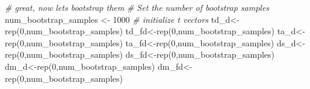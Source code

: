 \documentclass[
]{article}
\newenvironment{Shaded}{\begin{snugshade}}{\end{snugshade}}
\newcommand{\CommentTok}[1]{\textcolor[rgb]{0.56,0.35,0.01}{\textit{#1}}}
\newcommand{\DecValTok}[1]{\textcolor[rgb]{0.00,0.00,0.81}{#1}}
\newcommand{\FunctionTok}[1]{\textcolor[rgb]{0.00,0.00,0.00}{#1}}
\newcommand{\NormalTok}[1]{#1}
\newcommand{\OtherTok}[1]{\textcolor[rgb]{0.56,0.35,0.01}{#1}}
\begin{document}
\begin{Shaded}
\begin{Highlighting}[]
\CommentTok{\# great, now let\textquotesingle{}s bootstrap them}
\CommentTok{\# Set the number of bootstrap samples}
\NormalTok{num\_bootstrap\_samples }\OtherTok{\textless{}{-}} \DecValTok{1000}
\CommentTok{\# initialize t vectors}
\NormalTok{td\_d}\OtherTok{\textless{}{-}}\FunctionTok{rep}\NormalTok{(}\DecValTok{0}\NormalTok{,num\_bootstrap\_samples)}
\NormalTok{td\_fd}\OtherTok{\textless{}{-}}\FunctionTok{rep}\NormalTok{(}\DecValTok{0}\NormalTok{,num\_bootstrap\_samples)}
\NormalTok{ta\_d}\OtherTok{\textless{}{-}}\FunctionTok{rep}\NormalTok{(}\DecValTok{0}\NormalTok{,num\_bootstrap\_samples)}
\NormalTok{ta\_fd}\OtherTok{\textless{}{-}}\FunctionTok{rep}\NormalTok{(}\DecValTok{0}\NormalTok{,num\_bootstrap\_samples)}
\NormalTok{ds\_d}\OtherTok{\textless{}{-}}\FunctionTok{rep}\NormalTok{(}\DecValTok{0}\NormalTok{,num\_bootstrap\_samples)}
\NormalTok{ds\_fd}\OtherTok{\textless{}{-}}\FunctionTok{rep}\NormalTok{(}\DecValTok{0}\NormalTok{,num\_bootstrap\_samples)}
\NormalTok{dm\_d}\OtherTok{\textless{}{-}}\FunctionTok{rep}\NormalTok{(}\DecValTok{0}\NormalTok{,num\_bootstrap\_samples)}
\NormalTok{dm\_fd}\OtherTok{\textless{}{-}}\FunctionTok{rep}\NormalTok{(}\DecValTok{0}\NormalTok{,num\_bootstrap\_samples)}


\end{Highlighting}
\end{Shaded}
\end{document}
